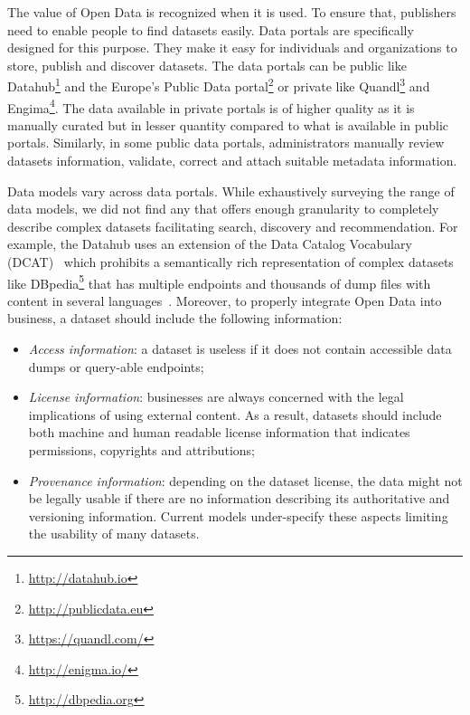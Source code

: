\documentclass[runningheads,a4paper]{../../Tools/LaTEX/llncs}
\begin{document}
The value of Open Data is recognized when it is used. To ensure that, publishers need to enable people to find datasets easily. Data portals are specifically designed for this purpose. They make it easy for individuals and organizations to store, publish and discover datasets. The data portals can be public like Datahub\footnote{\url{http://datahub.io}} and the Europe's Public Data portal\footnote{\url{http://publicdata.eu}} or private like Quandl\footnote{\url{https://quandl.com/}} and Engima\footnote{\url{http://enigma.io/}}. The data available in private portals is of higher quality as it is manually curated but in lesser quantity compared to what is available in public portals. Similarly, in some public data portals, administrators manually review datasets information, validate, correct and attach suitable metadata information.

Data models vary across data portals. While exhaustively surveying the range of data models, we did not find any that offers enough granularity to completely describe complex datasets facilitating search, discovery and recommendation. For example, the Datahub uses an extension of the Data Catalog Vocabulary (DCAT)~\cite{Erickson:DCV:14} which prohibits a semantically rich representation of complex datasets like DBpedia\footnote{\url{http://dbpedia.org}} that has multiple endpoints and thousands of dump files with content in several languages~\cite{Brummer::ICSS:14}. Moreover, to properly integrate Open Data into business, a dataset should include the following information:
\begin{itemize}
 \item \emph{Access information}: a dataset is useless if it does not contain accessible data dumps or query-able endpoints;
 \item \emph{License information}: businesses are always concerned with the legal implications of using external content. As a result, datasets should include both machine and human readable license information that indicates permissions, copyrights and attributions;
 \item \emph{Provenance information}: depending on the dataset license, the data might not be legally usable if there are no information describing its authoritative and versioning information. Current models under-specify these aspects limiting the usability of many datasets.
 \end{itemize}
\end{document}
